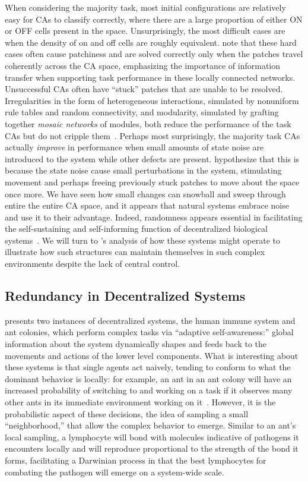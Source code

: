 \documentclass[a4paper,11pt]{report}
\begin{document}
When considering the majority task, most initial configurations are relatively easy for CAs to classify correctly, where there are a large proportion of either ON or OFF cells present in the space. Unsurprisingly, the most difficult cases are when the density of on and off cells are roughly equivalent. \citeauthor{me07} note that these hard cases often cause patchiness and are solved correctly only when the patches travel coherently across the CA space, emphasizing the importance of information transfer when supporting task performance in these locally connected networks. Unsuccessful CAs often have ``stuck'' patches that are unable to be resolved. Irregularities in the form of heterogeneous interactions, simulated by nonuniform rule tables and random connectivity, and modularity, simulated by grafting together \textit{mosaic networks} of modules, both reduce the performance of the task CAs but do not cripple them~\cite{me07}. Perhaps most surprisingly, the majority task CAs actually \textit{improve} in performance when small amounts of state noise are introduced to the system while other defects are present. \citeauthor{me07} hypothesize that this is because the state noise cause small perturbations in the system, stimulating movement and perhaps freeing previously stuck patches to move about the space once more. We have seen how small changes can snowball and sweep through entire the entire CA space, and it appears that natural systems embrace noise and use it to their advantage. Indeed, randomness appears essential in facilitating the self-sustaining and self-informing function of decentralized biological systems~\cite{mi05}. We will turn to \citeauthor{mi05}'s analysis of how these systems might operate to illustrate how such structures can maintain themselves in such complex environments despite the lack of central control.


\subsection{Redundancy in Decentralized Systems}
\citeauthor{mi05} presents two instances of decentralized systems, the human immune system and ant colonies, which perform complex tasks via ``adaptive self-awareness:'' global information about the system dynamically shapes and feeds back to the movements and actions of the lower level components. What is interesting about these systems is that single agents act naively, tending to conform to what the dominant behavior is locally: for example, an ant in an ant colony will have an increased probability of switching to and working on a task if it observes many other ants in its immediate environment working on it~\cite{mi05}. However, it is the probabilistic aspect of these decisions, the idea of sampling a small ``neighborhood,'' that allow the complex behavior to emerge. Similar to an ant's local sampling, a lymphocyte will bond with molecules indicative of pathogens it encounters locally and will reproduce proportional to the strength of the bond it forms, facilitating a Darwinian process in that the best lymphocytes for combating the pathogen will emerge on a system-wide scale.
\end{document}
